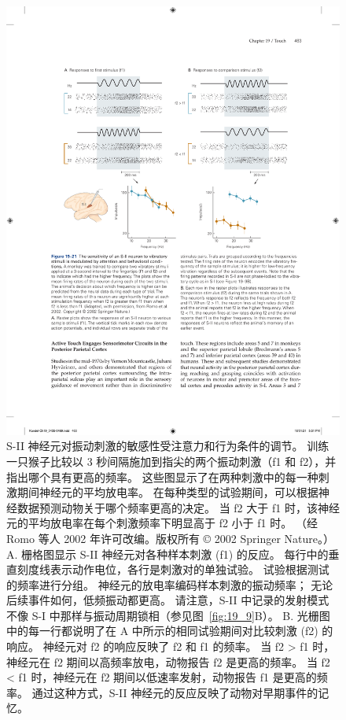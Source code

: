\begin{figure}[htbp]
	\centering
	\includegraphics[width=1.0\linewidth]{chap19/fig_19_21}
	\caption{S-II 神经元对振动刺激的敏感性受注意力和行为条件的调节。
		训练一只猴子比较以 3 秒间隔施加到指尖的两个振动刺激（f1 和 f2），并指出哪个具有更高的频率。
		这些图显示了在两种刺激中的每一种刺激期间神经元的平均放电率。
		在每种类型的试验期间，可以根据神经数据预测动物关于哪个频率更高的决定。
		当 f2 大于 f1 时，该神经元的平均放电率在每个刺激频率下明显高于 f2 小于 f1 时。 （经 Romo 等人 2002 年许可改编。版权所有 © 2002 Springer Nature。）
		A. 栅格图显示 S-II 神经元对各种样本刺激 (f1) 的反应。
		每行中的垂直刻度线表示动作电位，各行是刺激对的单独试验。
		试验根据测试的频率进行分组。
		神经元的放电率编码样本刺激的振动频率； 无论后续事件如何，低频振动都更高。
		请注意，S-II 中记录的发射模式不像 S-I 中那样与振动周期锁相（参见图~\ref{fig:19_9}B）。
		B. 光栅图中的每一行都说明了在 A 中所示的相同试验期间对比较刺激 (f2) 的响应。
		神经元对 f2 的响应反映了 f2 和 f1 的频率。
		当 f2 > f1 时，神经元在 f2 期间以高频率放电，动物报告 f2 是更高的频率。
		当 f2 < f1 时，神经元在 f2 期间以低速率发射，动物报告 f1 是更高的频率。
		通过这种方式，S-II 神经元的反应反映了动物对早期事件的记忆。}
	\label{fig:19_21}
\end{figure}


